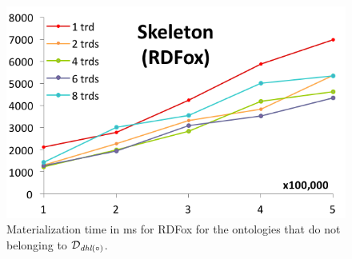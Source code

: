 \begin{figure}[htbp]
\begin{minipage}{.5\textwidth}
  \end{minipage}
  \begin{minipage}{.5\textwidth}
    \includegraphics[width=\textwidth]{experimentalResults/4-skeleton-rdfox}
  \end{minipage}
  \caption{Materialization time in ms for RDFox for the
    ontologies that do not belonging to $\mathcal{D}_{\textit{\text{dhl}}(\circ)}$.~\label{fig:eval}}
\end{figure}

